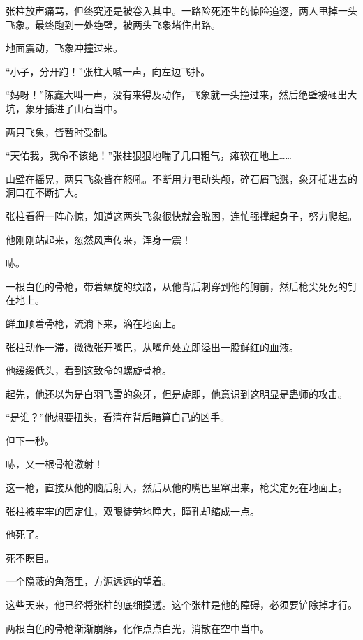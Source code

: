 
\begin{this_body}



张柱放声痛骂，但终究还是被卷入其中。一路险死还生的惊险追逐，两人甩掉一头飞象。最终跑到一处绝壁，被两头飞象堵住出路。

地面震动，飞象冲撞过来。

“小子，分开跑！”张柱大喊一声，向左边飞扑。

“妈呀！”陈鑫大叫一声，没有来得及动作，飞象就一头撞过来，然后绝壁被砸出大坑，象牙插进了山石当中。

两只飞象，皆暂时受制。

“天佑我，我命不该绝！”张柱狠狠地喘了几口粗气，瘫软在地上……

山壁在摇晃，两只飞象皆在怒吼。不断用力甩动头颅，碎石屑飞溅，象牙插进去的洞口在不断扩大。

张柱看得一阵心惊，知道这两头飞象很快就会脱困，连忙强撑起身子，努力爬起。

他刚刚站起来，忽然风声传来，浑身一震！

哧。

一根白色的骨枪，带着螺旋的纹路，从他背后刺穿到他的胸前，然后枪尖死死的钉在地上。

鲜血顺着骨枪，流淌下来，滴在地面上。

张柱动作一滞，微微张开嘴巴，从嘴角处立即溢出一股鲜红的血液。

他缓缓低头，看到这致命的螺旋骨枪。

起先，他还以为是白羽飞雪的象牙，但是旋即，他意识到这明显是蛊师的攻击。

“是谁？”他想要扭头，看清在背后暗算自己的凶手。

但下一秒。

哧，又一根骨枪激射！

这一枪，直接从他的脑后射入，然后从他的嘴巴里窜出来，枪尖定死在地面上。

张柱被牢牢的固定住，双眼徒劳地睁大，瞳孔却缩成一点。

他死了。

死不瞑目。

一个隐蔽的角落里，方源远远的望着。

这些天来，他已经将张柱的底细摸透。这个张柱是他的障碍，必须要铲除掉才行。

两根白色的骨枪渐渐崩解，化作点点白光，消散在空中当中。


\end{this_body}

